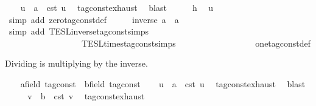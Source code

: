 \begin{isabellebody}
\ \ \isamarkupfalse%
\ u\ \ {\isacartoucheopen}a\ {\isacharequal}\ {\isasymtau}\isactrlsub c\isactrlsub s\isactrlsub t\ u{\isacartoucheclose}\ \isamarkupfalse%
\ tag{\isacharunderscore}const{\isachardot}exhaust\ \isamarkupfalse%
\ blast\isanewline
\ \ \isamarkupfalse%
\ \isamarkupfalse%
\ h\ \isamarkupfalse%
\ {\isacartoucheopen}u\ {\isasymnoteq}\ {}{\isacartoucheclose}\ \isamarkupfalse%
\ {\isacharparenleft}simp\ add{\isacharcolon}\ zero{\isacharunderscore}tag{\isacharunderscore}const{\isacharunderscore}def{\isacharparenright}\isanewline
\ \ \isamarkupfalse%
\ \isamarkupfalse%
\ {\isacartoucheopen}inverse\ a\ {\isacharasterisk}\ a\ {\isacharequal}\ {}{\isacartoucheclose}\isanewline
\ \ \ \ \isamarkupfalse%
\ {\isacharparenleft}simp\ add{\isacharcolon}\ TESL{\isachardot}inverse{\isacharunderscore}tag{\isacharunderscore}const{\isachardot}simps\isanewline
\ \ \ \ \ \ \ \ \ \ \ \ \ \ \ \ \ \ TESL{\isachardot}times{\isacharunderscore}tag{\isacharunderscore}const{\isachardot}simps\isanewline
\ \ \ \ \ \ \ \ \ \ \ \ \ \ \ \ \ \ one{\isacharunderscore}tag{\isacharunderscore}const{\isacharunderscore}def{\isacharparenright}\isanewline
{}\isamarkupfalse%
%
\begin{isamarkuptext}%
Dividing is multiplying by the inverse.%
\end{isamarkuptext}\isamarkuptrue%
\ \ \isamarkupfalse%
\ a{\isacharcolon}{\isacharcolon}{\isacartoucheopen}{\isacharprime}{\isasymtau}{\isacharcolon}{\isacharcolon}field\ tag{\isacharunderscore}const{\isacartoucheclose}\ \ b{\isacharcolon}{\isacharcolon}{\isacartoucheopen}{\isacharprime}{\isasymtau}{\isacharcolon}{\isacharcolon}field\ tag{\isacharunderscore}const{\isacartoucheclose}\isanewline
\ \ \isamarkupfalse%
\ u\ \ {\isacartoucheopen}a\ {\isacharequal}\ {\isasymtau}\isactrlsub c\isactrlsub s\isactrlsub t\ u{\isacartoucheclose}\ \isamarkupfalse%
\ tag{\isacharunderscore}const{\isachardot}exhaust\ \isamarkupfalse%
\ blast\isanewline
\ \ \isamarkupfalse%
\ \isamarkupfalse%
\ v\ \ {\isacartoucheopen}b\ {\isacharequal}\ {\isasymtau}\isactrlsub c\isactrlsub s\isactrlsub t\ v{\isacartoucheclose}\ \isamarkupfalse%
\ tag{\isacharunderscore}const{\isachardot}exhaust\ \isamarkupfalse%

\end{isabellebody}
